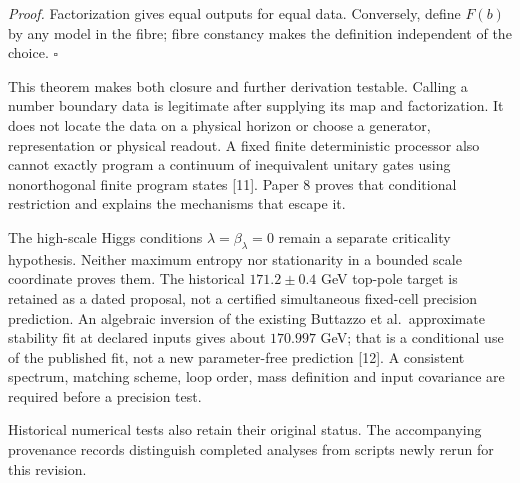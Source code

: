 \documentclass[
  11pt,
  a4paper,
]{article}
\begin{document}
\emph{Proof.} Factorization gives equal outputs for equal data. Conversely, define \(F(b)\) by any model in the fibre; fibre constancy makes the definition independent of the choice. \(\square\)

This theorem makes both closure and further derivation testable. Calling a number boundary data is legitimate after supplying its map and factorization. It does not locate the data on a physical horizon or choose a generator, representation or physical readout. A fixed finite deterministic processor also cannot exactly program a continuum of inequivalent unitary gates using nonorthogonal finite program states {[}11{]}. Paper 8 proves that conditional restriction and explains the mechanisms that escape it.

The high-scale Higgs conditions \(\lambda=\beta_\lambda=0\) remain a separate criticality hypothesis. Neither maximum entropy nor stationarity in a bounded scale coordinate proves them. The historical \(171.2\pm0.4\) GeV top-pole target is retained as a dated proposal, not a certified simultaneous fixed-cell precision prediction. An algebraic inversion of the existing Buttazzo et al.~approximate stability fit at declared inputs gives about \(170.997\) GeV; that is a conditional use of the published fit, not a new parameter-free prediction {[}12{]}. A consistent spectrum, matching scheme, loop order, mass definition and input covariance are required before a precision test.

Historical numerical tests also retain their original status. The accompanying provenance records distinguish completed analyses from scripts newly rerun for this revision.
\end{document}
